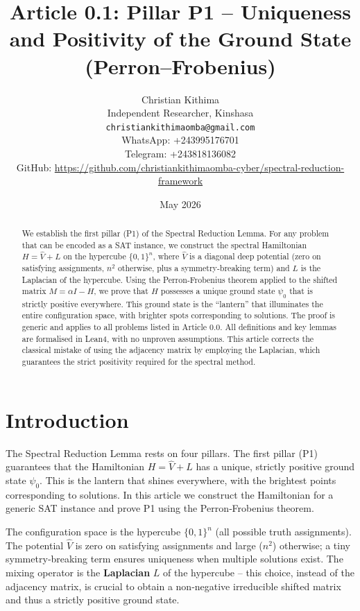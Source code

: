 \documentclass[11pt,a4paper]{article}
\title{Article 0.1: Pillar P1 – Uniqueness and Positivity of the Ground State (Perron–Frobenius)}
\author{Christian Kithima \\
Independent Researcher, Kinshasa \\
\texttt{christiankithimaomba@gmail.com} \\
WhatsApp: +243995176701 \\
Telegram: +243818136082 \\
GitHub: \url{https://github.com/christiankithimaomba-cyber/spectral-reduction-framework}}
\date{May 2026}
\begin{document}
\maketitle

\begin{abstract}
We establish the first pillar (P1) of the Spectral Reduction Lemma. For any problem that can be encoded as a SAT instance, we construct the spectral Hamiltonian \(H = \hat{V} + L\) on the hypercube \(\{0,1\}^n\), where \(\hat{V}\) is a diagonal deep potential (zero on satisfying assignments, \(n^2\) otherwise, plus a symmetry‑breaking term) and \(L\) is the Laplacian of the hypercube. Using the Perron‑Frobenius theorem applied to the shifted matrix \(M = \alpha I - H\), we prove that \(H\) possesses a unique ground state \(\psi_0\) that is strictly positive everywhere. This ground state is the “lantern” that illuminates the entire configuration space, with brighter spots corresponding to solutions. The proof is generic and applies to all problems listed in Article 0.0. All definitions and key lemmas are formalised in Lean4, with no unproven assumptions. This article corrects the classical mistake of using the adjacency matrix by employing the Laplacian, which guarantees the strict positivity required for the spectral method.
\end{abstract}

\tableofcontents

\section*{Introduction}

The Spectral Reduction Lemma rests on four pillars. The first pillar (P1) guarantees that the Hamiltonian \(H = \hat{V} + L\) has a unique, strictly positive ground state \(\psi_0\). This is the lantern that shines everywhere, with the brightest points corresponding to solutions. In this article we construct the Hamiltonian for a generic SAT instance and prove P1 using the Perron‑Frobenius theorem.

The configuration space is the hypercube \(\{0,1\}^n\) (all possible truth assignments). The potential \(\hat{V}\) is zero on satisfying assignments and large (\(n^2\)) otherwise; a tiny symmetry‑breaking term ensures uniqueness when multiple solutions exist. The mixing operator is the \textbf{Laplacian} \(L\) of the hypercube – this choice, instead of the adjacency matrix, is crucial to obtain a non‑negative irreducible shifted matrix and thus a strictly positive ground state.
\end{document}
